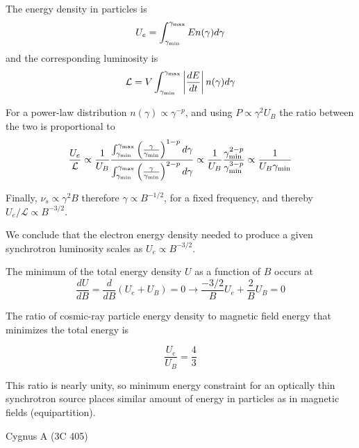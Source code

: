 The energy density in particles is
%
\[
U_e = \int_{\gamma_{\rm min}}^{\gamma_{\rm max}} E n(\gamma) d\gamma
\]
%
and the corresponding luminosity is
%
\[
\mathcal L = V \int_{\gamma_{\rm min}}^{\gamma_{\rm max}} \left| \frac{dE}{dt} \right| n(\gamma) d\gamma
\]

For a power-law distribution $n(\gamma) \propto \gamma^{-p}$, and using $P \propto \gamma^2 U_B$ the ratio between the two is proportional to
%
\begin{equation*}
\frac{U_e}{\mathcal L} \propto \frac{1}{U_B} \frac{\int_{\gamma_{\rm min}}^{\gamma_{\rm max}} \left( \frac{\gamma}{\gamma_{\rm min}}\right)^{1-p} d\gamma}{\int_{\gamma_{\rm min}}^{\gamma_{\rm max}}  \left( \frac{\gamma}{\gamma_{\rm min}}\right)^{2-p}  d\gamma} \propto \frac{1}{U_B} \frac{\gamma_{\rm min}^{2-p}}{\gamma_{\rm min}^{3-p}} \propto \frac{1}{U_B \gamma_{\rm min}}
\end{equation*}	

Finally, $\nu_s \propto \gamma^2 B$ therefore $\gamma \propto B^{-1/2}$, for a fixed frequency, and thereby $U_e / \mathcal L \propto B^{-3/2}$.  

We conclude that the electron energy density needed to produce a given synchrotron luminosity scales as $U_e \propto B^{-3/2}$. %

The minimum of the total energy density $U$ as a function of $B$ occurs at
%
\begin{equation*}
\frac{dU}{dB} = \frac{d}{dB} (U_e + U_B) = 0 \rightarrow \frac{-3/2}{B} U_e + \frac{2}{B} U_B = 0
\end{equation*}

The ratio of cosmic-ray particle energy density to magnetic field energy that minimizes the total energy is
%
\begin{remark}
\[
\frac{U_e}{U_B} = \frac{4}{3}
\]
\end{remark}

This ratio is nearly unity, so minimum energy constraint for an optically thin synchrotron source places similar amount of energy in particles as in magnetic fields (equipartition).

\begin{problem}
Cygnus A (3C 405)
\end{problem}

